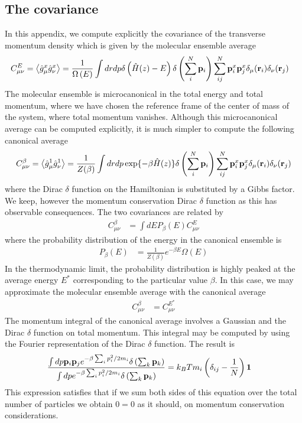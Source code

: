 \documentclass[b5paper,openright,10pt]{book}
\newcommand{\llangle}{\left\langle}
\newcommand{\rrangle}{\right\rangle}
\begin{document}
\begin{appendices}
\chapter{The covariance}
\label{Ap:Cov}
In  this  appendix,  we  compute   explicitly  the  covariance  of  the
transverse momentum density  which is given by  the molecular ensemble
average
\begin{align}
  C_{\mu\nu}^E&=\llangle \hat{g}_\mu^x\hat{g}_\nu^x\rrangle
=\frac{1}{\Omega\left(E\right)}
\int dr dp \delta\left(\hat{H}(z)-E\right)
\delta\left(\sum_i^N{\bf p}_i\right) 
\sum_{ij}^N{\bf p}_i^x{\bf p}_j^x\delta_{\mu}({\bf r}_i) 
\delta_{\nu}({\bf r}_j) 
\end{align}
The molecular ensemble is microcanonical in the total energy and total
momentum, where  we have chosen the  reference frame of the  center of
mass  of the  system, where  total momentum  vanishes.  Although  this
microcanonical average can be computed  explicitly, it is much simpler
to compute the following canonical average
\begin{align}
  C_{\mu\nu}^\beta =\llangle \hat{g}_\mu^1\hat{g}_\nu^1\rrangle
=\frac{1}{Z(\beta)}
\int dr dp \exp\{-\beta\hat{H}(z)\}
\delta\left(\sum_i^N{\bf p}_i\right) 
\sum_{ij}^N{\bf p}_i^x{\bf p}_j^x\delta_{\mu}({\bf r}_i) 
\delta_{\nu}({\bf r}_j) 
\end{align}
where the Dirac $\delta$ function on  the Hamiltonian is substituted by a
Gibbs factor. We  keep, however the momentum  conservation Dirac $\delta$
function as this has observable consequences.  The two covariances are
related by
\begin{align}
  C^{\beta}_{\mu\nu}&=\int dE P_\beta(E)
  C^{E}_{\mu\nu}
\end{align}
where the probability distribution of the energy in the canonical ensemble is
\begin{align}
P_\beta(E)&=  \frac{1}{Z(\beta)}e^{-\beta E}\Omega(E)
\end{align}
In the thermodynamic limit, the probability distribution is highly peaked
at the average energy $E^*$ corresponding to the particular value $\beta$. In this case, we may approximate the molecular
ensemble average with the canonical average
\begin{align}
  C^{\beta}_{\mu\nu}&=  C^{E^*}_{\mu\nu}
\end{align}
The momentum integral of the canonical average involves a Gaussian and the
Dirac $\delta$ function on total momentum. This integral may be computed by
using the Fourier representation of the Dirac $\delta$ function. The result
is
\begin{align}
  \frac{\int dp {\bf p}_i{\bf p}_je^{-\beta\sum_ip_i^2/2m_i}
\delta\left(\sum_k{\bf p}_k\right)}{\int dp e^{-\beta\sum_ip_i^2/2m_i}
\delta\left(\sum_k{\bf p}_k\right)}&=k_BT m_i\left(\delta_{ij}-\frac{1}{N}\right){\bf 1}
\label{momint}\end{align}
This expression satisfies  that if we sum both sides  of this equation
over the  total number of particles  we obtain $0=0$ as  it should, on
momentum conservation considerations.


\end{appendices}
\end{document}

